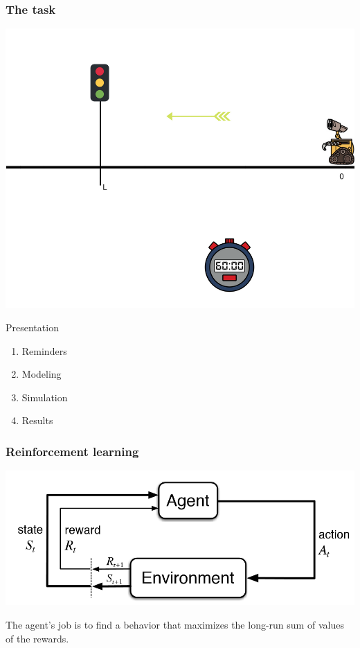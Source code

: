\documentclass[dvipsnames,svgnames]{beamer}
\begin{document}
\begin{frame}
\frametitle{The task}
\begin{center}
\includegraphics[scale=0.4]{img/illustration_traffic_light.png}
\end{center}
\end{frame}



\begin{frame}{Presentation}
\begin{block}{}
\begin{enumerate}
\item Reminders
\item Modeling
\item Simulation
\item Results
\end{enumerate}
\end{block}
\end{frame}

\begin{frame}
\frametitle{Reinforcement learning}
\centering
\includegraphics[scale=0.5]{img/RL_graph.png}
\vspace{1cm}

The agent's job is to find a behavior that maximizes the long-run sum of values of the rewards.
\end{frame}
\end{document}
